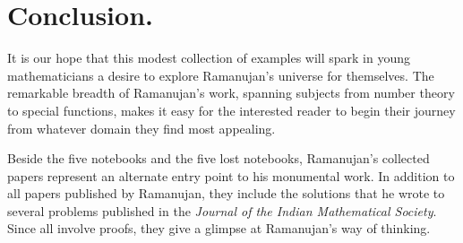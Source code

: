 \documentclass[11pt,oneside,reqno]{article}
\theoremstyle{definition}
\begin{document}


\section{Conclusion.}
It is our hope that this modest collection of examples will spark in young mathematicians a desire to explore Ramanujan’s universe for themselves. The remarkable breadth of Ramanujan’s work, spanning subjects from number theory to special functions, makes it easy for the interested reader to begin their journey from whatever domain they find most appealing.

Beside the five notebooks and the five lost notebooks, Ramanujan's collected papers \cite{Ramanujan Collected} represent an alternate entry point to his  monumental work. In addition to all papers published by Ramanujan, they include the solutions that he wrote to several problems published in the {\it  Journal of the Indian Mathematical Society}. Since all involve proofs, they give a glimpse at Ramanujan's way of thinking. 
\end{document}
